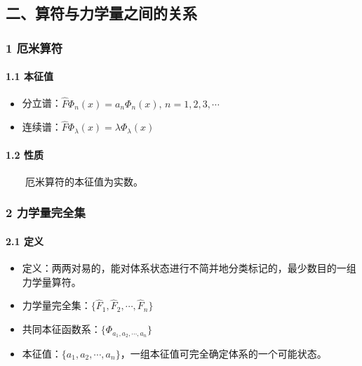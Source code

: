 \documentclass[UTF8,twocolumn]{ctexart}
\providecommand{\tightlist}{%
  \setlength{\itemsep}{0pt}\setlength{\parskip}{0pt}}
\let\oldparagraph\paragraph
\renewcommand{\paragraph}[1]{\oldparagraph{#1}\mbox{}}
\begin{document}
\hypertarget{ux4e8cux7b97ux7b26ux4e0eux529bux5b66ux91cfux4e4bux95f4ux7684ux5173ux7cfb}{%
\subsection{二、算符与力学量之间的关系}\label{ux4e8cux7b97ux7b26ux4e0eux529bux5b66ux91cfux4e4bux95f4ux7684ux5173ux7cfb}}

\hypertarget{ux5384ux7c73ux7b97ux7b26-1}{%
\subsubsection{1 厄米算符}\label{ux5384ux7c73ux7b97ux7b26-1}}

\hypertarget{ux672cux5f81ux503c}{%
\paragraph{ 1.1 本征值}\label{ux672cux5f81ux503c}}

\begin{itemize}
\tightlist
\item
  分立谱：\(\hat{F}\Phi_n(x)=a_n\Phi_n(x),\,n=1,2,3,\cdots\)
\item
  连续谱：\(\hat{F}\Phi_{\lambda}(x)=\lambda\Phi_{\lambda}(x)\)
\end{itemize}

\hypertarget{ux6027ux8d28}{%
\paragraph{ 1.2 性质}\label{ux6027ux8d28}}

  厄米算符的本征值为实数。

\hypertarget{ux529bux5b66ux91cfux5b8cux5168ux96c6}{%
\subsubsection{2
力学量完全集}\label{ux529bux5b66ux91cfux5b8cux5168ux96c6}}

\hypertarget{ux5b9aux4e49-1}{%
\paragraph{ 2.1 定义}\label{ux5b9aux4e49-1}}

\begin{itemize}
\tightlist
\item
  定义：两两对易的，能对体系状态进行不简并地分类标记的，最少数目的一组力学量算符。
\item
  力学量完全集：\(\{\hat{F}_1,\hat{F}_2,\cdots,\hat{F}_n\}\)
\item
  共同本征函数系：\(\{\Phi_{a_1,a_2,\cdots,a_n}\}\)
\item
  本征值：\(\{a_1,a_2,\cdots,a_n\}\)，一组本征值可完全确定体系的一个可能状态。
\end{itemize}
\end{document}
